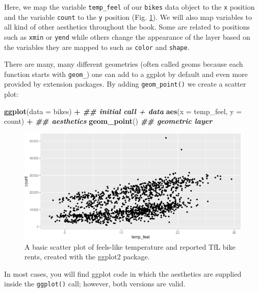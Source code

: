 \documentclass[
]{krantz}
\makeatletter
\newenvironment{Shaded}{\begin{snugshade}}{\end{snugshade}}
\newcommand{\AttributeTok}[1]{\textcolor[rgb]{0.27,0.27,0.27}{#1}}
\newcommand{\DocumentationTok}[1]{\textcolor[rgb]{0.37,0.37,0.37}{\textbf{\textit{#1}}}}
\newcommand{\FunctionTok}[1]{\textcolor[rgb]{0.27,0.27,0.27}{\textbf{#1}}}
\newcommand{\NormalTok}[1]{#1}
\newcommand{\SpecialCharTok}[1]{\textcolor[rgb]{0.43,0.43,0.43}{\textbf{#1}}}
\newenvironment{kframe}{%
\medskip{}
\setlength{\fboxsep}{.8em}
 \def\at@end@of@kframe{}%
 \ifinner\ifhmode%
  \def\at@end@of@kframe{\end{minipage}}%
  \begin{minipage}{\columnwidth}%
 \fi\fi%
 \def\FrameCommand##1{\hskip\@totalleftmargin \hskip-\fboxsep
 \colorbox{shadecolor}{##1}\hskip-\fboxsep
     \hskip-\linewidth \hskip-\@totalleftmargin \hskip\columnwidth}%
 \MakeFramed {\advance\hsize-\width
   \@totalleftmargin\z@ \linewidth\hsize
   \@setminipage}}%
 {\par\unskip\endMakeFramed%
 \at@end@of@kframe}
\renewenvironment{Shaded}{\begin{kframe}}{\end{kframe}}
\makeatother
\begin{document}
Here, we map the variable \texttt{temp\_feel} of our \texttt{bikes} data object to the \texttt{x} position and the variable \texttt{count} to the \texttt{y} position (Fig. \ref{fig:04ggplotBasic}). We will also map variables to all kind of other aesthetics throughout the book. Some are related to positions such as \texttt{xmin} or \texttt{yend} while others change the appearance of the layer based on the variables they are mapped to such as \texttt{color} and \texttt{shape}.

There are many, many different geometries (often called geoms because each function starts with \texttt{geom\_}) one can add to a ggplot by default and even more provided by extension packages. By adding \texttt{geom\_point()} we create a scatter plot:

\begin{Shaded}
\begin{Highlighting}[]
\FunctionTok{ggplot}\NormalTok{(}\AttributeTok{data =}\NormalTok{ bikes) }\SpecialCharTok{+}             \DocumentationTok{\#\# initial call + data}
  \FunctionTok{aes}\NormalTok{(}\AttributeTok{x =}\NormalTok{ temp\_feel, }\AttributeTok{y =}\NormalTok{ count) }\SpecialCharTok{+}  \DocumentationTok{\#\# aesthetics}
  \FunctionTok{geom\_point}\NormalTok{()                     }\DocumentationTok{\#\# geometric layer}
\end{Highlighting}
\end{Shaded}

\begin{figure}
\centering
\includegraphics{bookdown_files/figure-latex/04ggplotBasic-1.png}
\caption{\label{fig:04ggplotBasic}A basic scatter plot of feels-like temperature and reported TfL bike rents, created with the ggplot2 package.}
\end{figure}

In most cases, you will find ggplot code in which the aesthetics are supplied inside the \texttt{ggplot()} call; however, both versions are valid.
\end{document}
